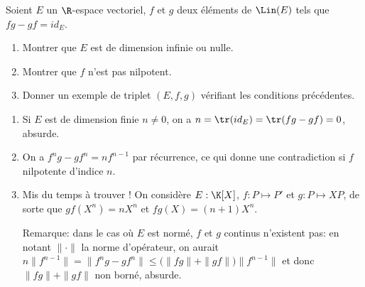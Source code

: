 \begin{enonce}
\begin{exercise}[ID={RMS134 E574},subtitle={Oral
    Mines-Ponts},theme={algebre},annee={2023},concours={mines-ponts},filiere={MP}, difficulty={0}]
Soient $E$ un $\R$-espace vectoriel, $f$ et $g$ deux éléments de
$\Lin(E)$ tels que $fg-gf=id_E$.
\begin{enumerate}
\item Montrer que $E$ est de dimension infinie ou nulle.
\item Montrer que $f$ n'est pas nilpotent.
\item Donner un exemple de triplet $(E,f,g)$ vérifiant les conditions
  précédentes.
\end{enumerate}
\end{exercise}
\begin{solution}
  \begin{enumerate}
  \item Si $E$ est de dimension finie $n\neq 0$, on a
    $n=\tr(id_E)=\tr(fg-gf)=0$, absurde.
  \item On a $f^ng-gf^n=nf^{n-1}$ par récurrence, ce qui donne une
    contradiction si $f$ nilpotente d'indice $n$.
  \item Mis du temps à trouver ! On considère $E:\K[X]$, $f:P\mapsto
    P'$ et $g:P\mapsto XP$, de sorte que $gf(X^n)=nX^n$ et
    $fg(X)=(n+1)X^n$.
    
    Remarque: dans le cas où $E$ est normé, $f$ et $g$ continus
    n'existent pas: en notant $\|\cdot\|$ la norme d'opérateur, on aurait
    $n\|f^{n-1}\|=\|f^ng-gf^n\|\le \big(\|fg\|+\|gf\|\big)\|f^{n-1}\|$
    et donc $\|fg\|+\|gf\|$ non borné, absurde.
  \end{enumerate}
\end{solution}
\end{enonce}